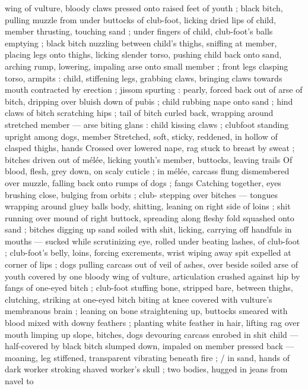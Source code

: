 wing of vulture, bloody claws pressed onto raised feet of youth ; 
black bitch, pulling muzzle from under buttocks of club-foot, licking 
dried lips of child, member thrusting, touching sand ; under fingers 
of child, club-foot's balls emptying ; black bitch nuzzling between 
child's thighs, sniffing at member, placing legs onto thighs, licking 
slender torso, pushing child back onto sand, arching rump, lowering, 
impaling arse onto small member ; front legs clasping torso, armpits 
: child, stiffening legs, grabbing claws, bringing claws towards mouth 
contracted by erection ; jissom spurting : pearly, forced back out of 
arse of bitch, dripping over bluish down of pubis ; child rubbing 
nape onto sand ; hind claws of bitch scratching hips ; tail of bitch 
curled back, wrapping around stretched member --- arse biting glans 
: child kissing claws ; clubfoot standing upright among dogs, member 
Stretched, soft, sticky, reddened, in hollow of clasped thighs, hands 
Crossed over lowered nape, rag stuck to breast by sweat ; bitches 
driven out of mélée, licking youth's member, buttocks, leaving trails 
Of blood, flesh, grey down, on scaly cuticle ; in mélée, carcass flung 
dismembered over muzzle, falling back onto rumps of dogs ; fangs 
Catching together, eyes brushing close, bulging from orbits ; club- 
stepping over bitches --- tongues wrapping around gluey balls 
body, shitting, leaning on right side of loins ; shit running over 
mound of right buttock, spreading along fleshy fold squashed onto 
sand ; bitches digging up sand soiled with shit, licking, carrying off 
handfuls in mouths --- sucked while scrutinizing eye, rolled under 
beating lashes, of club-foot ; club-foot's belly, loins, forcing 
excrements, wrist wiping away spit expelled at corner of lips ; dogs 
pulling carcass out of veil of ashes, over beside soiled arse of youth 
covered by one bloody wing of vulture, articulation crushed against 
hip by fangs of one-eyed bitch ; club-foot stuffing bone, stripped 
bare, between thighs, clutching, striking at one-eyed bitch biting at 
knee covered with vulture's membranous brain ; leaning on bone 
straightening up, buttocks smeared with blood mixed with downy 
feathers ; planting white feather in hair, lifting rag over mouth 
limping up slope, bitches, dogs devouring carcass enrobed in shit 
child --- half-covered by black bitch slumped down, impaled on 
member pressed back --- moaning, leg stiffened, transparent 
vibrating beneath fire ; {\slash} in sand, hands of dark worker stroking 
shaved worker's skull ; two bodies, hugged in jeans from navel to 
